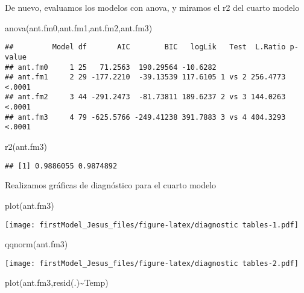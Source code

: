 \documentclass[
]{article}
\newenvironment{Shaded}{\begin{snugshade}}{\end{snugshade}}
\newcommand{\FunctionTok}[1]{\textcolor[rgb]{0.00,0.00,0.00}{#1}}
\newcommand{\NormalTok}[1]{#1}
\newcommand{\SpecialCharTok}[1]{\textcolor[rgb]{0.00,0.00,0.00}{#1}}
\begin{document}
De nuevo, evaluamos los modelos con anova, y miramos el r2 del cuarto
modelo

\begin{Shaded}
\begin{Highlighting}[]
\FunctionTok{anova}\NormalTok{(ant.fm0,ant.fm1,ant.fm2,ant.fm3)}
\end{Highlighting}
\end{Shaded}

\begin{verbatim}
##         Model df       AIC        BIC   logLik   Test  L.Ratio p-value
## ant.fm0     1 25   71.2563  190.29564 -10.6282                        
## ant.fm1     2 29 -177.2210  -39.13539 117.6105 1 vs 2 256.4773  <.0001
## ant.fm2     3 44 -291.2473  -81.73811 189.6237 2 vs 3 144.0263  <.0001
## ant.fm3     4 79 -625.5766 -249.41238 391.7883 3 vs 4 404.3293  <.0001
\end{verbatim}

\begin{Shaded}
\begin{Highlighting}[]
\FunctionTok{r2}\NormalTok{(ant.fm3)}
\end{Highlighting}
\end{Shaded}

\begin{verbatim}
## [1] 0.9886055 0.9874892
\end{verbatim}

Realizamos gráficas de diagnóstico para el cuarto modelo

\begin{Shaded}
\begin{Highlighting}[]
\FunctionTok{plot}\NormalTok{(ant.fm3)}
\end{Highlighting}
\end{Shaded}

\texttt{[image: firstModel\_Jesus\_files/figure-latex/diagnostic tables-1.pdf]}

\begin{Shaded}
\begin{Highlighting}[]
\FunctionTok{qqnorm}\NormalTok{(ant.fm3)}
\end{Highlighting}
\end{Shaded}

\texttt{[image: firstModel\_Jesus\_files/figure-latex/diagnostic tables-2.pdf]}

\begin{Shaded}
\begin{Highlighting}[]
\FunctionTok{plot}\NormalTok{(ant.fm3,}\FunctionTok{resid}\NormalTok{(.)}\SpecialCharTok{\textasciitilde{}}\NormalTok{Temp)}
\end{Highlighting}
\end{Shaded}
\end{document}
